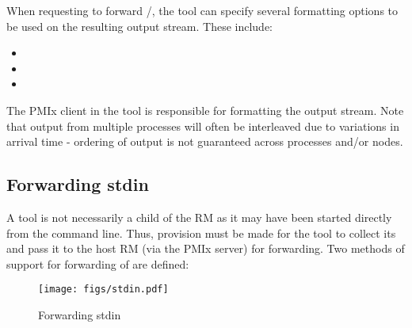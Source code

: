 When requesting to forward /, the tool can specify several formatting options to be used on the resulting output stream. These include:

\begin{itemize}
    \item {}
    \item {}
    \item {}
\end{itemize}

The \ac{PMIx} client in the tool is responsible for formatting the output stream. Note that output from multiple processes will often be interleaved due to variations in arrival time - ordering of output is not guaranteed across processes and/or nodes.

\subsection{Forwarding stdin}

A tool is not necessarily a child of the \ac{RM} as it may have been started directly from the command line. Thus, provision must be made for the tool to collect its  and pass it to the host \ac{RM} (via the \ac{PMIx} server) for forwarding. Two methods of support for forwarding of  are defined:

\begingroup
\begin{figure*}[ht!]
  \begin{center}
    \texttt{[image: figs/stdin.pdf]}
  \end{center}
  \caption{Forwarding stdin}
  \label{fig:stdin}
\end{figure*}
\endgroup

